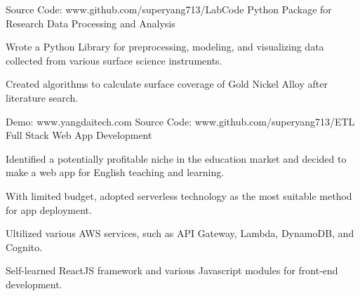 


\begin{cventries}


\cventry
{Source Code: www.github.com/superyang713/LabCode}
{Python Package for Research Data Processing and Analysis}
{}
{}
{
\begin{cvitems}
\item {Wrote a Python Library for preprocessing, modeling, and visualizing data
    collected from various surface science instruments.}
\item {Created algorithms to calculate surface coverage of Gold Nickel Alloy
    after literature search.}
\end{cvitems}
}


\cventry
{Demo: www.yangdaitech.com   Source Code: www.github.com/superyang713/ETL}
{Full Stack Web App Development}
{}
{}
{
\begin{cvitems}
\item {Identified a potentially profitable niche in the education market and
    decided to make a web app for English teaching and learning.}
\item {With limited budget, adopted serverless technology as the
    most suitable method for app deployment.}
\item {Ultilized various AWS services, such as API Gateway, Lambda, DynamoDB,
    and Cognito.}
\item {Self-learned ReactJS framework and various Javascript modules for
    front-end development.}
\end{cvitems}
}


\end{cventries}


